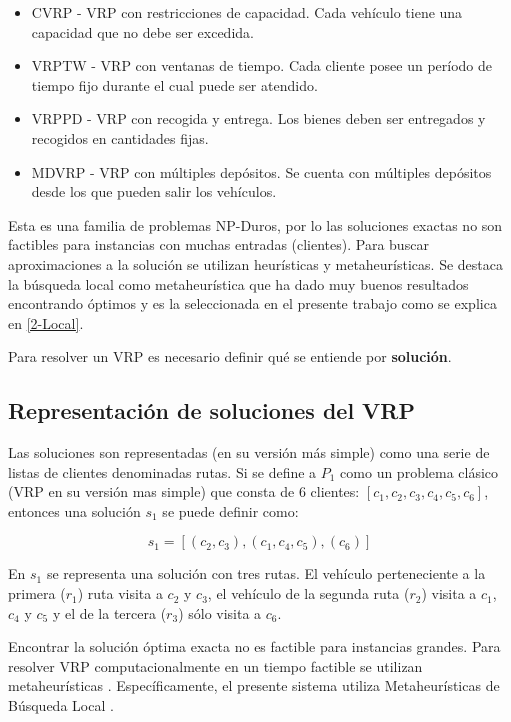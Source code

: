 \begin{itemize}
	\item CVRP - VRP con restricciones de capacidad. Cada vehículo tiene una capacidad que no debe ser excedida.
	\item VRPTW - VRP con ventanas de tiempo. Cada cliente posee un período de tiempo fijo durante el cual puede ser atendido.
	\item VRPPD - VRP con recogida y entrega. Los bienes deben ser entregados y recogidos en cantidades fijas.
	\item MDVRP - VRP con múltiples depósitos. Se cuenta con múltiples depósitos desde los que pueden salir los vehículos.
\end{itemize}

Esta es una familia de problemas NP-Duros\cite{TODO}, por lo las soluciones exactas no son factibles para instancias con muchas entradas (clientes). Para buscar aproximaciones a la solución se utilizan heurísticas y metaheurísticas. Se destaca la búsqueda local como metaheurística que ha dado muy buenos resultados encontrando óptimos \cite{TODO} y es la seleccionada en el presente trabajo como se explica en \ref{2-Local}. 

Para resolver un VRP es necesario definir qué se entiende por \textbf{solución}.

\subsection{Representación de soluciones del VRP}\label{2-Sol}
Las soluciones son representadas (en su versión más simple) como una serie de listas de clientes denominadas rutas.
Si se define a $P_1$ como un problema clásico (VRP en su versión mas simple) que consta de 6 clientes: $[c_1, c_2, c_3, c_4, c_5, c_6]$, entonces una solución $s_1$ se puede definir como:

\begin{equation}
	s_1 = [(c_2,c_3), (c_1,c_4,c_5), (c_6)]
\end{equation}

En $s_1$ se representa una solución con tres rutas. El vehículo perteneciente a la primera ($r_1$) ruta visita a $c_2$ y $c_3$, el vehículo de la segunda ruta ($r_2$) visita a $c_1$, $c_4$ y $c_5$ y el de la tercera ($r_3$) sólo visita a $c_6$. 

Encontrar la solución óptima exacta no es factible para instancias grandes. Para resolver VRP computacionalmente en un tiempo factible se utilizan metaheurísticas \cite{TODO}. Específicamente, el presente sistema utiliza Metaheurísticas de Búsqueda Local \cite{TODO}.

